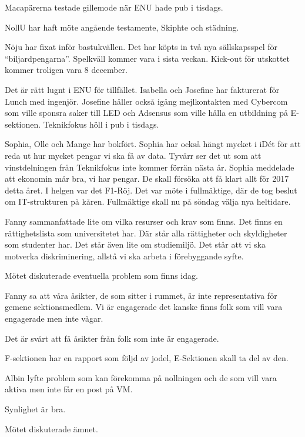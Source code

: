 \documentclass[10pt]{article}
\begin{document}
\begin{paragrafer}
\begin{paragrafer}
Macapärerna testade gillemode när ENU hade pub i tisdags.

NollU har haft möte angående testamente, Skiphte och städning.

Nöju har fixat inför bastukvällen. Det har köpts in två nya sällskapsspel för ``biljardpengarna''. Spelkväll kommer vara i sista veckan. Kick-out för utskottet kommer troligen vara 8 december.

Det är rätt lugnt i ENU för tillfället. Isabella och Josefine har fakturerat för Lunch med ingenjör. Josefine håller också igång mejlkontakten med Cybercom som ville sponsra saker till LED och Adsensus som ville hålla en utbildning på E-sektionen. Teknikfokus höll i pub i tisdags.

Sophia, Olle och Mange har bokfört. Sophia har också hängt mycket i iDét för att reda ut hur mycket pengar vi ska få av data. Tyvärr ser det ut som att vinstdelningen från Teknikfokus inte kommer förrän nästa år.
Sophia meddelade att ekonomin mår bra, vi har pengar. De skall försöka att få klart allt för 2017 detta året.
I helgen var det F1-Röj. Det var möte i fullmäktige, där de tog beslut om IT-strukturen på kåren. Fullmäktige skall nu på söndag välja nya heltidare.
\end{paragrafer}

Fanny sammanfattade lite om vilka resurser och krav som finns. Det finns en rättighetslista som universitetet har. Där står alla rättigheter och skyldigheter som studenter har. Det står även lite om studiemiljö. Det står att vi ska motverka diskriminering, allstå vi ska arbeta i förebyggande syfte.

Mötet diskuterade eventuella problem som finns idag.

Fanny sa att våra åsikter, de som sitter i rummet, är inte representativa för gemene sektionsmedlem. Vi är engagerade det kanske finns folk som vill vara engagerade men inte vågar.

Det är svårt att få åsikter från folk som inte är engagerade.

F-sektionen har en rapport som följd av jodel, E-Sektionen skall ta del av den.

Albin lyfte problem som kan förekomma på nollningen och de som vill vara aktiva men inte får en post på VM.

Synlighet är bra.

Mötet diskuterade ämnet.


\end{paragrafer}
\end{document}

